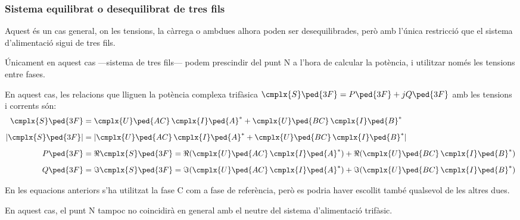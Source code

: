 \subsubsection{Sistema equilibrat o desequilibrat de tres fils}

Aquest és un cas  general, on les tensions, la càrrega o ambdues alhora  poden ser desequilibrades, però amb l'única restricció que
el sistema d'alimentació sigui de tres fils.

 Únicament en aquest cas ---sistema de tres fils--- podem prescindir del punt N a l'hora de
calcular la potència, i utilitzar només les tensions entre fases.

En aquest cas, les relacions que lliguen la potència complexa
trifàsica $\cmplx{S}\ped{3F} = P\ped{3F} + j Q\ped{3F}$ amb les
tensions i corrents són:
\begin{align}
    \cmplx{S}\ped{3F} &= \cmplx{U}\ped{AC} \,\cmplx{I}\ped{A}^*
     +  \cmplx{U}\ped{BC} \,\cmplx{I}\ped{B}^*  \label{eq:s_3f_3fils}\\[2mm]
    |\cmplx{S}\ped{3F}| &= |\cmplx{U}\ped{AC}\, \cmplx{I}\ped{A}^* +
    \cmplx{U}\ped{BC}\, \cmplx{I}\ped{B}^*| \\[2mm]
    P\ped{3F} &= \Re\cmplx{S}\ped{3F}= \Re(\cmplx{U}\ped{AC}\, \cmplx{I}\ped{A}^*) +
    \Re(\cmplx{U}\ped{BC}\, \cmplx{I}\ped{B}^*) \\[2mm]
    Q\ped{3F} &= \Im\cmplx{S}\ped{3F}=\Im(\cmplx{U}\ped{AC} \,\cmplx{I}\ped{A}^*) +
    \Im(\cmplx{U}\ped{BC} \,\cmplx{I}\ped{B}^*)
\end{align}

En les equacions anteriors s'ha utilitzat la fase C com a
fase de referència, però es podria haver escollit també qualsevol de
les altres dues.

En aquest cas, el punt N tampoc no coincidirà en general amb
el neutre del sistema d'alimentació trifàsic.

